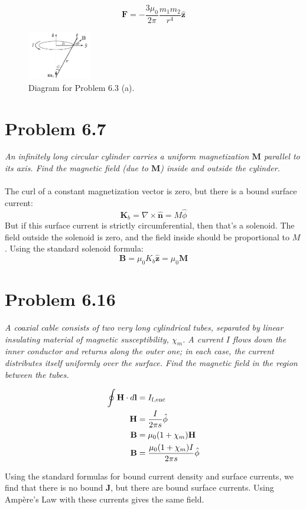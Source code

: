 \documentclass[10pt]{article}
\begin{document}
\begin{itemize}
\begin{equation}
\mathbf{F} = -\frac{3\mu_0}{2\pi}\frac{m_1 m_2}{r^4}\hat{\mathbf{z}}
\end{equation}
\begin{figure}[ht]
\centering
\includegraphics[width=0.25\textwidth]{dipole.png}
\caption{\label{fig:1} Diagram for Problem 6.3 (a).}
\end{figure}
\end{itemize}

\section{Problem 6.7}

\textit{An infinitely long circular cylinder carries a uniform magnetization $\mathbf{M}$ parallel to its axis.  Find the magnetic field (due to $\mathbf{M}$) inside and outside the cylinder.} \\ \\
The curl of a constant magnetization vector is zero, but there is a bound surface current:
\begin{equation}
\mathbf{K}_b = \nabla \times \hat{\mathbf{n}} = M\hat{\phi}
\end{equation}
But if this surface current is strictly circumferential, then that's a solenoid.  The field outside the solenoid is zero, and the field inside should be proportional to $M$.  Using the standard solenoid formula:
\begin{equation}
\mathbf{B} = \mu_0 K_b \hat{\mathbf{z}} = \mu_0 \mathbf{M}
\end{equation}

\section{Problem 6.16}

\textit{A coaxial cable consists of two very long cylindrical tubes, separated by linear insulating material of magnetic susceptibility, $\chi_m$.  A current $I$ flows down the inner conductor and returns along the outer one; in each case, the current distributes itself uniformly over the surface.  Find the magnetic field in the region between the tubes.}

\begin{align}
\oint \mathbf{H} \cdot d\mathbf{l} &= I_{\rm f,enc} \\
\mathbf{H} &= \frac{I}{2\pi s}\hat{\mathbf{\phi}}  \\
\mathbf{B} &= \mu_0(1+\chi_m) \mathbf{H} \\
\mathbf{B} &= \frac{\mu_0(1+\chi_m) I}{2\pi s}\hat{\mathbf{\phi}}
\end{align}

Using the standard formulas for bound current density and surface currents, we find that there is no bound $\mathbf{J}$, but there are bound surface currents.  Using Amp\`{e}re's Law with these currents gives the same field.
\end{document}
